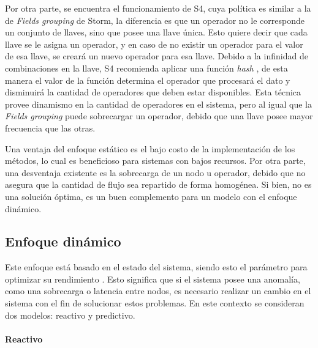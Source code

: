 Por otra parte, se encuentra el funcionamiento de S4, cuya política es similar a la de \textit{Fields grouping} de Storm, la diferencia es que un operador no le corresponde un conjunto de llaves, sino que posee una llave única. Esto quiere decir que cada llave se le asigna un operador, y en caso de no existir un operador para el valor de esa llave, se creará un nuevo operador para esa llave. Debido a la infinidad de combinaciones en la llave, S4 recomienda aplicar una función \textit{hash} \citep{RogawayS04}, de esta manera el valor de la función determina el operador que procesará el dato y disminuirá la cantidad de operadores que deben estar disponibles. Esta técnica provee dinamismo en la cantidad de operadores en el sistema, pero al igual que la \textit{Fields grouping} puede sobrecargar un operador, debido que una llave posee mayor frecuencia que las otras.

Una ventaja del enfoque estático es el bajo costo de la implementación de los métodos, lo cual es beneficioso para sistemas con bajos recursos. Por otra parte, una desventaja existente es la sobrecarga de un nodo u operador, debido que no asegura que la cantidad de flujo sea repartido de forma homogénea. Si bien, no es una solución óptima, es un buen complemento para un modelo con el enfoque dinámico.

\subsection{Enfoque dinámico}
\label{subsec:enfoqueDinamicoBC}


Este enfoque está basado en el estado del sistema, siendo esto el parámetro para optimizar su rendimiento \citep{CasavantK88}. Esto significa que si el sistema posee una anomalía, como una sobrecarga o latencia entre nodos, es necesario realizar un cambio en el sistema con el fin de solucionar estos problemas. En este contexto se consideran dos modelos: reactivo y predictivo.

\paragraph{Reactivo}

